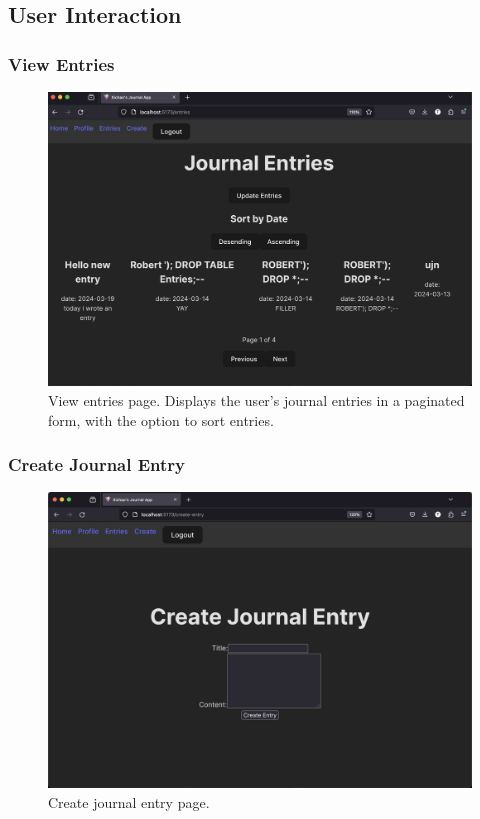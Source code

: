 \subsection{User Interaction}

\subsubsection{View Entries}
\begin{figure}[H]
\centering
\includegraphics[width=\linewidth]{Assets/UI-View-Entries.png}
\caption{View entries page. Displays the user's journal entries in a paginated form, with the option to sort entries.}
\label{fig:uiviewentries}
\end{figure}

\subsubsection{Create Journal Entry}
\begin{figure}[H]
\centering
\includegraphics[width=\linewidth]{Assets/UI-create-journal.png}
\caption{Create journal entry page.}
\label{fig:uicreatejournal}
\end{figure}

